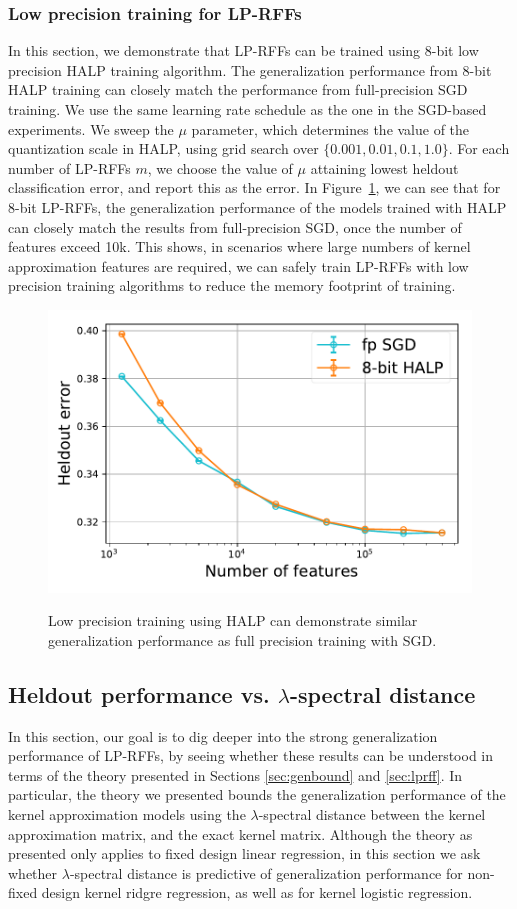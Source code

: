\subsubsection{Low precision training for LP-RFFs}
\label{sec:halp}
In this section, we demonstrate that LP-RFFs can be trained using 8-bit low precision HALP training algorithm. The generalization performance from 8-bit HALP training can closely match the performance from full-precision SGD training. We use the same learning rate schedule as the one in the SGD-based experiments. We sweep the $\mu$ parameter, which determines the value of the quantization scale in HALP, using grid search over $\{0.001, 0.01, 0.1, 1.0\}$. For each number of LP-RFFs $m$, we choose the value of $\mu$ attaining lowest heldout classification error, and report this as the error. In Figure~\ref{fig:halp}, we can see that for 8-bit LP-RFFs, the generalization performance of the models trained with HALP can closely match the results from full-precision SGD, once the number of features exceed 10k. This shows, in scenarios where large numbers of kernel approximation features are required, we can safely train LP-RFFs with low precision training algorithms to reduce the memory footprint of training.
\label{sec:lptrain}
\begin{figure}
\centering
	\includegraphics[width=.6\linewidth]{figures/timit_error_vs_n_feat_lm_halp.pdf}
\label{fig:halp}
\caption{Low precision training using HALP can demonstrate similar generalization performance as full precision training with SGD.}	
\end{figure}

\subsection{Heldout performance vs. $\lambda$-spectral distance}
In this section, our goal is to dig deeper into the strong generalization performance of LP-RFFs, by seeing whether these results can be understood in terms of the theory presented in Sections \ref{sec:genbound} and \ref{sec:lprff}.  In particular, the theory we presented bounds the generalization performance of the kernel approximation models using the $\lambda$-spectral distance between the kernel approximation matrix, and the exact kernel matrix.  Although the theory as presented only applies to fixed design linear regression, in this section we ask whether $\lambda$-spectral distance is predictive of generalization performance for non-fixed design kernel ridgre regression, as well as for kernel logistic regression.


